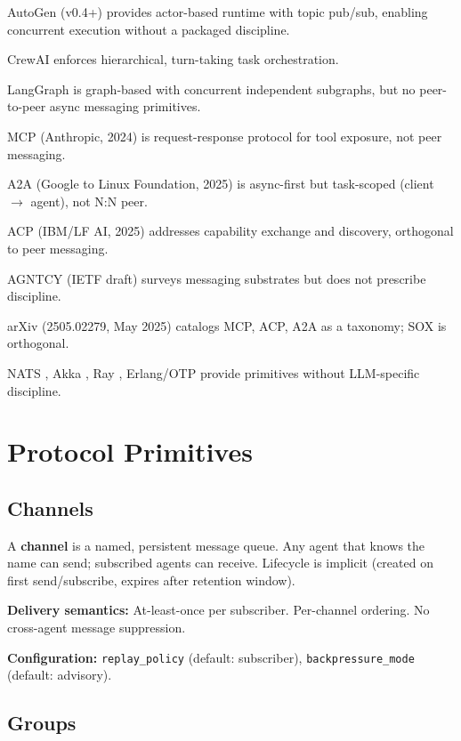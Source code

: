 \documentclass[11pt]{article}
\begin{document}
AutoGen \cite{autogen2024} (v0.4+) provides actor-based runtime with topic pub/sub, enabling concurrent execution without a packaged discipline.

CrewAI \cite{crewai2024} enforces hierarchical, turn-taking task orchestration.

LangGraph \cite{langgraph2024} is graph-based with concurrent independent subgraphs, but no peer-to-peer async messaging primitives.

MCP \cite{mcp2024} (Anthropic, 2024) is request-response protocol for tool exposure, not peer messaging.

A2A \cite{a2a2025} (Google to Linux Foundation, 2025) is async-first but task-scoped (client $\rightarrow$ agent), not N:N peer.

ACP \cite{acp2025} (IBM/LF AI, 2025) addresses capability exchange and discovery, orthogonal to peer messaging.

AGNTCY \cite{agntcy2025} (IETF draft) surveys messaging substrates but does not prescribe discipline.

arXiv \cite{taxonomy2025} (2505.02279, May 2025) catalogs MCP, ACP, A2A as a taxonomy; SOX is orthogonal.

NATS \cite{nats2024}, Akka \cite{akka2024}, Ray \cite{ray2024}, Erlang/OTP \cite{erlang2024} provide primitives without LLM-specific discipline.

\section{Protocol Primitives}

\subsection{Channels}

A \textbf{channel} is a named, persistent message queue. Any agent that knows the name can send; subscribed agents can receive. Lifecycle is implicit (created on first send/subscribe, expires after retention window).

\textbf{Delivery semantics:} At-least-once per subscriber. Per-channel ordering. No cross-agent message suppression.

\textbf{Configuration:} \texttt{replay\_policy} (default: subscriber), \texttt{backpressure\_mode} (default: advisory).

\subsection{Groups}
\end{document}
